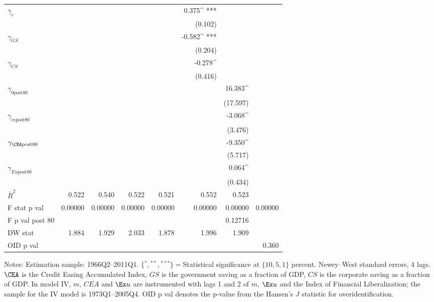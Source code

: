 \begin{table}
\begin{center}
\begin{tabular}{@{}ld{6}d{6}d{6}d{6}d{6}d{6}d{6}@{}}
 $\gamma_{r}$  &   & & & & 0.375^{ ***}  & & \\
 &   &  & & & (0.102)  & & \\
 $\gamma_{GS}$  &   & & & & -0.582^{ ***}  & & \\
 &   &  & & & (0.204)  &  & \\
 $\gamma_{CS}$  &   & & & &-0.278^{ }  & & \\
 &   &  & & & (0.416)  & & \\
 $\gamma_{\text{0post80}}$  &   & & & & &16.383^{ }  &  \\
 &   &  & & & & (17.597)   & \\
 $\gamma_{m\text{post80}}$  &   & & & & &-3.068^{ }  &  \\
 &   &  & &  & &(3.476)  &  \\
 $\gamma_{\CEA\text{post80}}$  &   & & & & &-9.350^{ }  & \\
 &   &  & & & &(5.717)  & \\
 $\gamma_{Eu\text{post80}}$  &   & & & & &0.064^{ }  &  \\
 &   &  & &  & & (0.434)  &  \\
\midrule
 $\bar{R}^2$  & 0.522  & 0.540  & 0.522  & 0.521  & 0.552  & 0.523  & \\
 F stat p val  & 0.00000  & 0.00000  & 0.00000  & 0.00000  & 0.00000  & 0.00000  & 0.00000\\
 F p val post 80 &  & & & & & 0.12716  &  \\
DW stat  & 1.884  & 1.929  & 2.033  & 1.878  & 1.996  & 1.909 & \\
OID p val &  & & & &  & & 0.360\\
\bottomrule
\end{tabular}
\end{center}
 {\footnotesize Notes: Estimation sample: 1966Q2--2011Q1. $\{{}^*,{}^{**},{}^{***}\}={}$Statistical significance at $\{10,5,1\}$ percent. Newey--West standard errors, 4 lags. $\CEA$ is the Credit Easing Accumulated Index, $GS$ is the government saving as a fraction of GDP, $CS$ is the corporate saving as a fraction of GDP. In model IV, $m$, $CEA$ and $\Ex u$ are instrumented with lags 1 and 2 of $m$, $\Ex u$ and the \cite{abiadEtAl_FinReforms} Index of Financial Liberalization; the sample for the IV model is 1973Q1--2005Q4. OID p val denotes the p-value from the Hansen's $J$ statistic for overidentification.}
\end{table}
